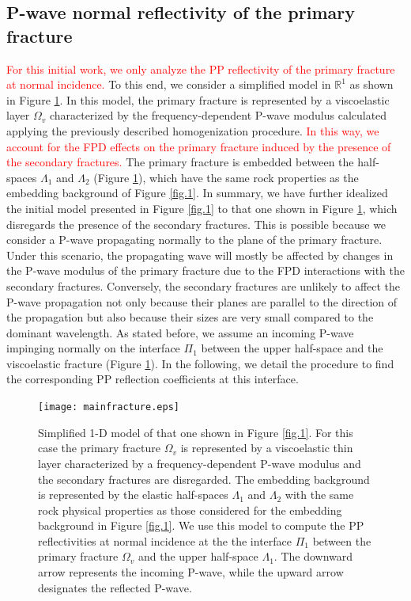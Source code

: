 \documentclass[draft]{agujournal2019}
\newcommand{\red}{\textcolor{red}}
\begin{document}
\subsection{P-wave normal reflectivity of the primary fracture}
\red{For this initial work, we only analyze the PP reflectivity of the primary fracture at normal incidence. 
}To this end,
we consider a simplified  model in $\mathbb R^1$ as shown in Figure \ref{fig.3}. In this model, the primary fracture is represented by a viscoelastic layer $\Omega_v$ characterized by the frequency-dependent P-wave modulus calculated applying the previously described homogenization procedure. 
\red{
In this way, we account for the FPD effects on the primary fracture induced by the presence of the secondary fractures.}
The primary fracture is embedded between the half-spaces $\Lambda_1$ and $\Lambda_2$ (Figure \ref{fig.3}), which have the same rock properties as the embedding background of Figure \ref{fig.1}. In summary, we have further idealized the initial model presented in Figure \ref{fig.1} to that one shown in  Figure \ref{fig.3}, which disregards the presence of the secondary fractures. This is possible because we consider a P-wave propagating normally to the plane of the primary fracture. Under this scenario, the propagating wave will mostly be affected by changes in the P-wave modulus of the primary fracture due to the FPD interactions with the secondary fractures. Conversely, the secondary fractures are unlikely to affect the P-wave propagation not only because their planes are parallel to the direction of the propagation but also because their sizes are very small compared to the dominant wavelength. As stated before, we  assume an incoming P-wave impinging normally on the interface $\Pi_1$ between the upper half-space and the viscoelastic fracture (Figure \ref{fig.3}). In the following, we detail the procedure to find the corresponding PP reflection coefficients at this interface.

 \begin{figure}[!ht]
\centering
        \texttt{[image: mainfracture.eps]}
\caption{ Simplified 1-D model of that one shown in Figure \ref{fig.1}. For this case the primary fracture $\Omega_v$ is represented by a viscoelastic thin layer characterized by a frequency-dependent P-wave modulus and the secondary fractures are disregarded. The embedding background is represented by the  elastic half-spaces $\Lambda_1$ and $\Lambda_2$ with the same rock physical properties as those considered for the embedding background in Figure \ref{fig.1}. We 
use this model to compute the PP reflectivities at normal incidence at the the interface $\Pi_1$ between the primary fracture $\Omega_v$ and the upper half-space $\Lambda_1$. The downward arrow represents the incoming P-wave, while the upward arrow designates the reflected P-wave.
}
\label{fig.3}
\end{figure}
\end{document}
